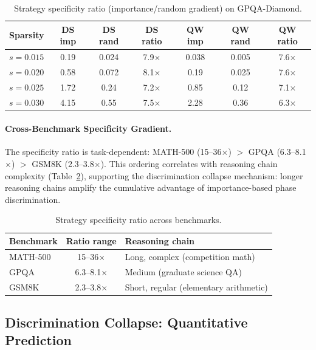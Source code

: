 \documentclass[11pt]{article}
\begin{document}
\begin{table}[h]
\centering
\caption{Strategy specificity ratio (importance/random gradient) on GPQA-Diamond.}
\label{tab:specificity}
\begin{tabular}{lcccccc}
\toprule
Sparsity & DS imp & DS rand & DS ratio & QW imp & QW rand & QW ratio \\
\midrule
$s=0.015$ & 0.19 & 0.024 & 7.9$\times$ & 0.038 & 0.005 & 7.6$\times$ \\
$s=0.020$ & 0.58 & 0.072 & 8.1$\times$ & 0.19 & 0.025 & 7.6$\times$ \\
$s=0.025$ & 1.72 & 0.24 & 7.2$\times$ & 0.85 & 0.12 & 7.1$\times$ \\
$s=0.030$ & 4.15 & 0.55 & 7.5$\times$ & 2.28 & 0.36 & 6.3$\times$ \\
\bottomrule
\end{tabular}
\end{table}

\paragraph{Cross-Benchmark Specificity Gradient.}
The specificity ratio is task-dependent: MATH-500 (15--36$\times$) $>$ GPQA (6.3--8.1$\times$) $>$ GSM8K (2.3--3.8$\times$). This ordering correlates with reasoning chain complexity (Table~\ref{tab:cross_bench_spec}), supporting the discrimination collapse mechanism: longer reasoning chains amplify the cumulative advantage of importance-based phase discrimination.

\begin{table}[h]
\centering
\caption{Strategy specificity ratio across benchmarks.}
\label{tab:cross_bench_spec}
\begin{tabular}{lcl}
\toprule
Benchmark & Ratio range & Reasoning chain \\
\midrule
MATH-500 & 15--36$\times$ & Long, complex (competition math) \\
GPQA & 6.3--8.1$\times$ & Medium (graduate science QA) \\
GSM8K & 2.3--3.8$\times$ & Short, regular (elementary arithmetic) \\
\bottomrule
\end{tabular}
\end{table}

\subsection{Discrimination Collapse: Quantitative Prediction}
\label{sec:mechanism}
\end{document}

